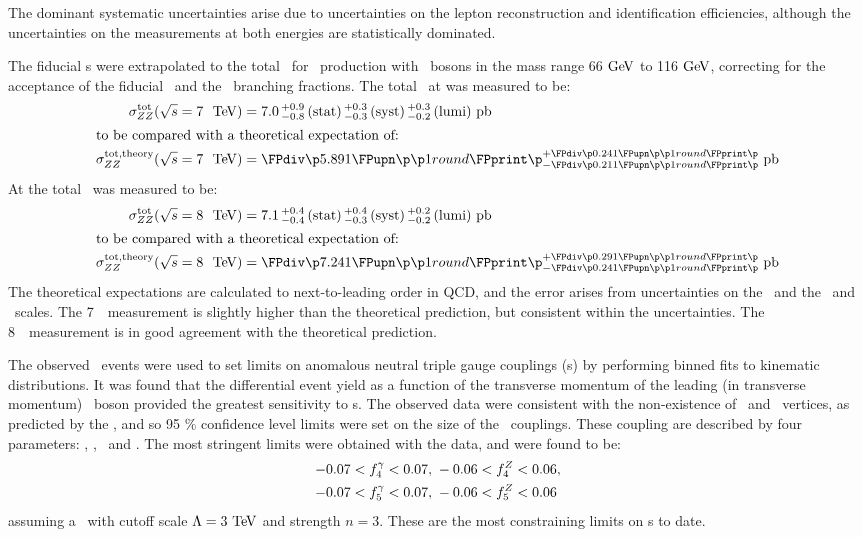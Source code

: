 The dominant systematic uncertainties arise due to uncertainties on the lepton
reconstruction and identification efficiencies, although the uncertainties on
the measurements at both energies are statistically dominated.

The fiducial \cx s were extrapolated to the total \cx\ for \ZZ\
production with \Z\ bosons in the mass range 66$\GeV$ to 116$\GeV$, 
correcting for the acceptance of the fiducial \phasespace\ and the \Zll\
branching fractions. The total \cx\ at  was measured to be:
\begin{align}
\sigmaTotZZ(\sqrtseq{7}) &= \ZZSevenTeVTotalCrossSection \\
\intertext{to be compared with a theoretical expectation of:}
\sigmaTotTheoryZZ(\sqrtseq{7}) &= \ZZSevenTeVTheoryTotalCrossSection
\end{align}
At \sqrtseq{8} the total \cx\ was measured to be:
\begin{align}
\sigmaTotZZ(\sqrtseq{8}) &= \ZZEightTeVTotalCrossSection \\
\intertext{to be compared with a theoretical expectation of:}
\sigmaTotTheoryZZ(\sqrtseq{8}) &= \ZZEightTeVTheoryTotalCrossSection
\end{align}
The theoretical expectations are calculated to next-to-leading order in QCD, and
the error arises from uncertainties on the \partDF\ and the \fact\ and \renorm\
scales. The 7~\tev\ measurement is slightly higher than the theoretical prediction,
but consistent within the uncertainties. The 8~\tev\ measurement is in good
agreement with the theoretical prediction. 

The observed \ZZllll\ events were used to set limits on anomalous neutral triple
gauge couplings (\TGC s) by performing binned fits to kinematic distributions.
It was found that the differential event yield as a function of the transverse
momentum of the leading (in transverse momentum) \Z\ boson provided the
greatest sensitivity to \TGC s. The observed data were consistent with the non-existence of 
\ZZZ\ and \ZZg\ vertices, as predicted by the \sm, and so 95 \% confidence level
limits were set on the size of the \TGC\ couplings. These coupling are
described by four parameters: \ffourg, \ffourZ, \ffiveg\ and \ffiveZ. The
most stringent limits were obtained with the \sqrtseq{8} data, and were found to
be:
\begin{align}
-0.07 < f_{4}^{\gamma} < 0.07, &\; -0.06 < f_{4}^{Z} < 0.06, \nonumber \\
-0.07 < f_{5}^{\gamma} < 0.07, &\; -0.06 < f_{5}^{Z} < 0.06
\end{align}
assuming a \formfactor\ with cutoff scale $\Lambda=3 \tev$ and strength $n=3$.
These are the most constraining limits on \TGC s to date.

